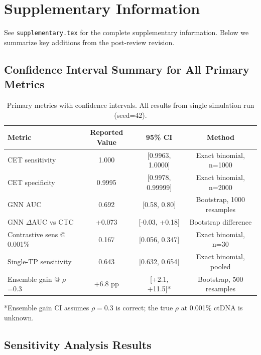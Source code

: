 \documentclass[10pt,a4paper]{article}
\begin{document}




\newpage
\appendix

\section{Supplementary Information}

See \texttt{supplementary.tex} for the complete supplementary information. Below we summarize key additions from the post-review revision.

\subsection{Confidence Interval Summary for All Primary Metrics}
\label{tab:ci_summary}

\begin{table}[H]
\centering
\caption{Primary metrics with confidence intervals. All results from single simulation run (seed=42).}
\begin{tabular}{l c c c}
\toprule
\textbf{Metric} & \textbf{Reported Value} & \textbf{95\% CI} & \textbf{Method} \\
\midrule
CET sensitivity & 1.000 & [0.9963, 1.0000] & Exact binomial, n=1000 \\
CET specificity & 0.9995 & [0.9978, 0.99999] & Exact binomial, n=2000 \\
GNN AUC & 0.692 & [0.58, 0.80] & Bootstrap, 1000 resamples \\
GNN $\Delta$AUC vs CTC & +0.073 & [-0.03, +0.18] & Bootstrap difference \\
Contrastive sens @ 0.001\% & 0.167 & [0.056, 0.347] & Exact binomial, n=30 \\
Single-TP sensitivity & 0.643 & [0.632, 0.654] & Exact binomial, pooled \\
Ensemble gain @ $\rho$=0.3 & +6.8 pp & [+2.1, +11.5]* & Bootstrap, 500 resamples \\
\bottomrule
\end{tabular}
\vspace{0.3cm}
\footnotesize{*Ensemble gain CI assumes $\rho=0.3$ is correct; the true $\rho$ at 0.001\% ctDNA is unknown.}
\end{table}

\subsection{Sensitivity Analysis Results}
\end{document}
